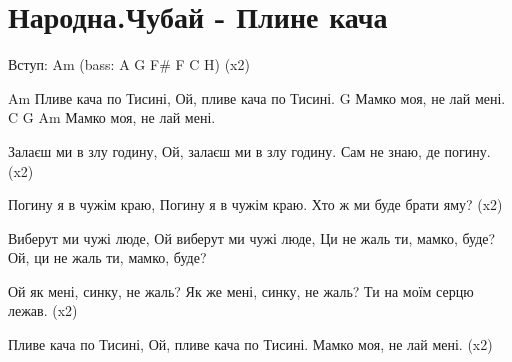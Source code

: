 \section{Народна\Т.Чубай - Плине кача}
\begin{guitar}

Вступ: Am (bass: A G F# F C H)  (x2)

Am
   Пливе кача по Тисині,
   Ой, пливе кача по Тисині.
                      G
   Мамко моя, не лай мені.
    C      G   Am
   Мамко моя, не лай мені.

Залаєш ми в злу годину,
Ой, залаєш ми в злу годину.
Сам не знаю, де погину.   (x2)

Погину я в чужім краю,
Погину я в чужім краю.
Хто ж ми буде брати яму?  (x2)

Виберут ми чужі люде,
Ой виберут ми чужі люде,
Ци не жаль ти, мамко, буде?
Ой, ци не жаль ти, мамко, буде?

Ой як мені, синку, не жаль?
Як же мені, синку, не жаль?
Ти на моїм серцю лежав.   (x2)

Пливе кача по Тисині,
Ой, пливе кача по Тисині.
Мамко моя, не лай мені.   (x2)
\end{guitar}
